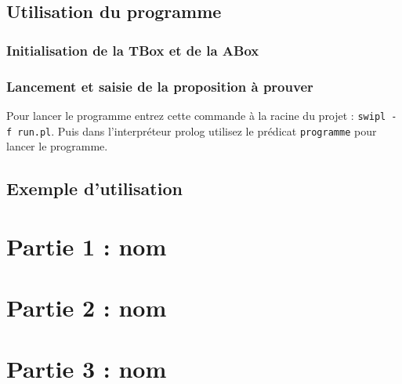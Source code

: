 \documentclass[12pt]{article}
\begin{document}
\subsection{Utilisation du programme}
\subsubsection{Initialisation de la TBox et de la ABox}

\subsubsection{Lancement et saisie de la proposition à prouver}
Pour lancer le programme entrez cette commande à la racine du projet : \verb|swipl -f run.pl|. Puis dans l'interpréteur prolog utilisez le prédicat \verb|programme| pour lancer le programme.


\subsection{Exemple d'utilisation}

\section{Partie 1 : nom}

\section{Partie 2 : nom}

\section{Partie 3 : nom}
\end{document}
